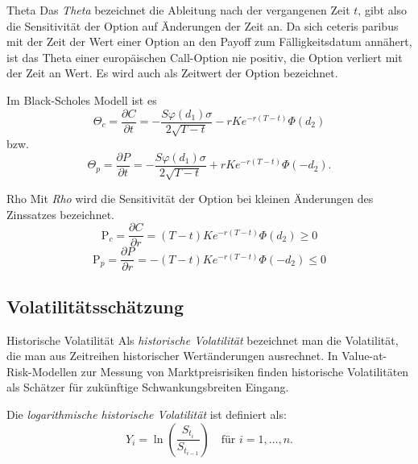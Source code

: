 \begin{bonus}[Griechen]{Theta}
    Das \emph{Theta} bezeichnet die Ableitung nach der vergangenen Zeit $t$, gibt also die Sensitivität der Option auf Änderungen der Zeit an.
    Da sich ceteris paribus mit der Zeit der Wert einer Option an den Payoff zum Fälligkeitsdatum annähert, ist das Theta einer europäischen Call-Option nie positiv, die Option verliert mit der Zeit an Wert.
    Es wird auch als Zeitwert der Option bezeichnet.

    Im Black-Scholes Modell ist es
    \[
        \Theta _{c}={\frac {\partial C}{\partial t}}=-{\frac {S\varphi (d_{1})\sigma }{2{\sqrt {T-t}}}}-rKe^{-r(T-t)}\Phi (d_{2})
    \]
    bzw.
    \[
        \Theta _{p}={\frac {\partial P}{\partial t}}=-{\frac {S\varphi (d_{1})\sigma }{2{\sqrt {T-t}}}}+rKe^{-r(T-t)}\Phi (-d_{2}).
    \]
\end{bonus}

\begin{bonus}[Griechen]{Rho}
    Mit \emph{Rho} wird die Sensitivität der Option bei kleinen Änderungen des Zinssatzes bezeichnet.
    \[
        \mathrm {P} _{c}={\frac {\partial C}{\partial r}}=(T-t)Ke^{-r(T-t)}\Phi (d_{2})\geq 0
    \]
    \[
        \mathrm {P} _{p}={\frac {\partial P}{\partial r}}=-(T-t)Ke^{-r(T-t)}\Phi (-d_{2})\leq 0
    \]
\end{bonus}

\subsection{Volatilitätsschätzung}

\begin{defi}{Historische Volatilität}
    Als \emph{historische Volatilität} bezeichnet man die Volatilität, die man aus Zeitreihen historischer Wertänderungen ausrechnet.
    In Value-at-Risk-Modellen zur Messung von Marktpreisrisiken finden historische Volatilitäten als Schätzer für zukünftige Schwankungsbreiten Eingang.

    Die \emph{logarithmische historische Volatilität} ist definiert als:
    \[
        Y_i = \ln\left(\frac{S_{t_i}}{S_{t_{i-1}}}\right) \quad \text{für } i = 1, \ldots, n.
    \]
\end{defi}

